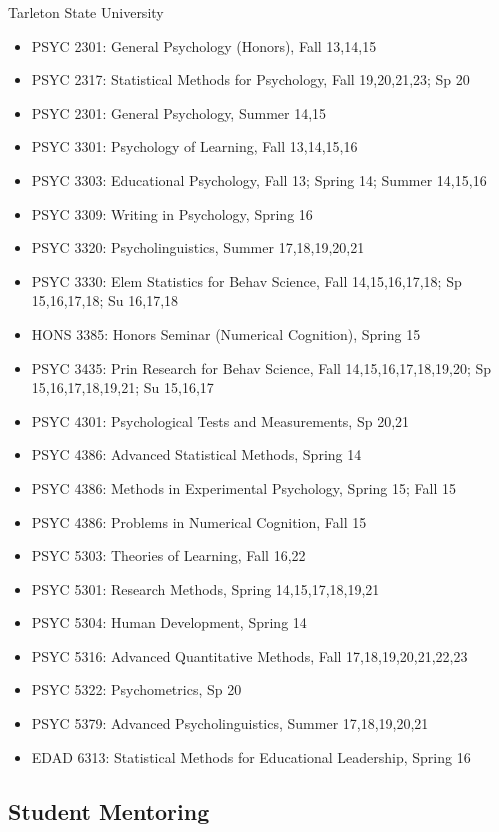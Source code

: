 \documentclass[article,10pt]{article}
\begin{document}
Tarleton State University

\begin{itemize}
\item PSYC 2301: General Psychology (Honors), Fall 13,14,15
\item PSYC 2317: Statistical Methods for Psychology, Fall 19,20,21,23; Sp 20
\item PSYC 2301: General Psychology, Summer 14,15
\item PSYC 3301: Psychology of Learning, Fall 13,14,15,16
\item PSYC 3303: Educational Psychology, Fall 13; Spring 14; Summer 14,15,16
\item PSYC 3309: Writing in Psychology, Spring 16
\item PSYC 3320: Psycholinguistics, Summer 17,18,19,20,21
\item PSYC 3330: Elem Statistics for Behav Science, Fall 14,15,16,17,18; Sp 15,16,17,18; Su 16,17,18
\item HONS 3385: Honors Seminar (Numerical Cognition), Spring 15
\item PSYC 3435: Prin Research for Behav Science, Fall 14,15,16,17,18,19,20; Sp 15,16,17,18,19,21; Su 15,16,17
\item PSYC 4301: Psychological Tests and Measurements, Sp 20,21
\item PSYC 4386: Advanced Statistical Methods, Spring 14
\item PSYC 4386: Methods in Experimental Psychology, Spring 15; Fall 15
\item PSYC 4386: Problems in Numerical Cognition, Fall 15
\item PSYC 5303: Theories of Learning, Fall 16,22
\item PSYC 5301: Research Methods, Spring 14,15,17,18,19,21
\item PSYC 5304: Human Development, Spring 14
\item PSYC 5316: Advanced Quantitative Methods, Fall 17,18,19,20,21,22,23
\item PSYC 5322: Psychometrics, Sp 20
\item PSYC 5379: Advanced Psycholinguistics, Summer 17,18,19,20,21
\item EDAD 6313: Statistical Methods for Educational Leadership, Spring 16
\end{itemize}

\subsection*{Student Mentoring}
\label{sec:org5478c71}
\end{document}
